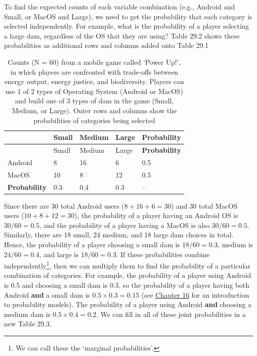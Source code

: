 \documentclass[
  openany]{scrbook}
\begin{document}
To find the expected counts of each variable combination (e.g., Android and Small, or MacOS and Large), we need to get the probability that each category is selected independently.
For example, what is the probability of a player selecting a large dam, regardless of the OS that they are using?
Table 29.2 shows these probabilities as additional rows and columns added onto Table 29.1

\begin{longtable}[]{@{}lllll@{}}
\caption{\label{tab:unnamed-chunk-121}Counts (N = 60) from a mobile game called `Power Up!', in which players are confronted with trade-offs between energy output, energy justice, and biodiversity. Players can use 1 of 2 types of Operating System (Android or MacOS) and build one of 3 types of dam in the game (Small, Medium, or Large). Outer rows and columns show the probabilities of categories being selected}\tabularnewline
\toprule
& Small & Medium & Large & \textbf{Probability} \\
\midrule
\endfirsthead
\toprule
& Small & Medium & Large & \textbf{Probability} \\
\midrule
\endhead
Android & 8 & 16 & 6 & 0.5 \\
MacOS & 10 & 8 & 12 & 0.5 \\
\textbf{Probability} & 0.3 & 0.4 & 0.3 & -- \\
\bottomrule
\end{longtable}

Since there are 30 total Android users (\(8 + 16 + 6 = 30\)) and 30 total MacOS users (\(10 + 8 + 12 = 30\)), the probability of a player having an Android OS is \(30/60 = 0.5\), and the probability of a player having a MacOS is also \(30 / 60 = 0.5\).
Similarly, there are 18 small, 24 medium, and 18 large dam choices in total.
Hence, the probability of a player choosing a small dam is \(18/60 = 0.3\), medium is \(24/60 = 0.4\), and large is \(18/60 = 0.3\).
If these probabilities combine independently\footnote{We can call these the `marginal probabilities'.}, then we can multiply them to find the probability of a particular combination of categories.
For example, the probability of a player using Android is 0.5 and choosing a small dam is 0.3, so the probability of a player having both Android \textbf{and} a small dam is \(0.5 \times 0.3 = 0.15\) (see \protect\hyperlink{Chapter_16}{Chapter 16} for an introduction to probability models).
The probability of a player using Android \textbf{and} choosing a medium dam is \(0.5 \times 0.4 = 0.2\).
We can fill in all of these joint probabilities in a new Table 29.3.
\end{document}
